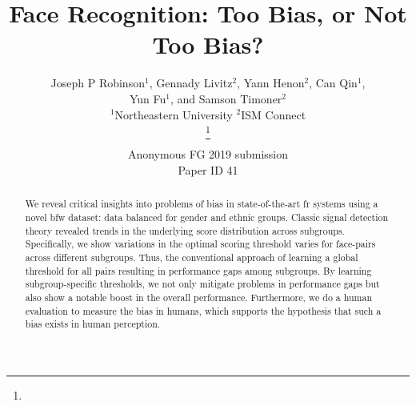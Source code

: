 \documentclass[a4paper, 10pt, conference]{ieeeconf}      %
\title{\LARGE \bf\vspace{-10mm}
Face Recognition: Too Bias, or Not Too Bias?
}
\author{\parbox{16cm}{\centering
    {\large Joseph P Robinson$^1$, Gennady Livitz$^2$, Yann Henon$^2$, Can Qin$^1$,\\ Yun Fu$^1$, and Samson Timoner$^2$}\\
    {\normalsize
    \hspace{-.4in}$^{1}$Northeastern University\hspace{.7in} $^{2}$ISM Connect}}
    \thanks{}%
}
\def\FGPaperID{41} %
\begin{document}
\begin{bibunit}


\def\angle{0}
\def\radius{3}
\def\cyclelist{{"orange","blue","red","green","magenta","cyan"}}
\newcount\cyclecount {}
\newcount\ind {}

\ifFGfinal
\thispagestyle{empty}
\pagestyle{empty}
\else
\author{Anonymous FG 2019 submission\\ Paper ID \FGPaperID \\}
\pagestyle{plain}
\fi
\maketitle


\begin{abstract}
We reveal critical insights into problems of bias in state-of-the-art \gls{fr} systems using a novel \gls{bfw} dataset: data balanced for gender and ethnic groups. Classic signal detection theory revealed trends in the underlying score distribution across subgroups. Specifically, we show variations in the optimal scoring threshold varies for face-pairs across different subgroups. Thus, the conventional approach of learning a  global threshold for all pairs resulting in performance gaps among subgroups. By learning subgroup-specific thresholds, we not only mitigate problems in performance gaps but also show a notable boost in the overall performance. Furthermore, we do a human evaluation to measure the bias in humans, which supports the hypothesis that such a bias exists in human perception. 
\end{abstract}























\end{bibunit}
\end{document}
